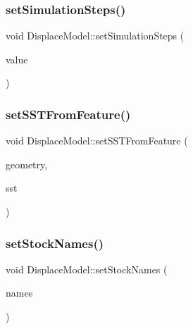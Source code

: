 \mbox{\label{class_displace_model_a37ba1a54fada6de2335be2c94f98ece3}} 
\subsubsection{\texorpdfstring{setSimulationSteps()}{setSimulationSteps()}}
{\footnotesize\ttfamily void Displace\+Model\+::set\+Simulation\+Steps (\begin{DoxyParamCaption}\item[{int}]{value }\end{DoxyParamCaption})}

\mbox{\label{class_displace_model_ab2b49b329dbd03a01b3314897f578693}} 
\subsubsection{\texorpdfstring{setSSTFromFeature()}{setSSTFromFeature()}}
{\footnotesize\ttfamily void Displace\+Model\+::set\+S\+S\+T\+From\+Feature (\begin{DoxyParamCaption}\item[{O\+G\+R\+Geometry $\ast$}]{geometry,  }\item[{double}]{sst }\end{DoxyParamCaption})}

\mbox{\label{class_displace_model_accae3c9f9c7720e2c048897bd6d874d6}} 
\subsubsection{\texorpdfstring{setStockNames()}{setStockNames()}}
{\footnotesize\ttfamily void Displace\+Model\+::set\+Stock\+Names (\begin{DoxyParamCaption}\item[{const Q\+Map$<$ Q\+String, int $>$ \&}]{names }\end{DoxyParamCaption})\hspace{0.3cm}{\ttfamily [inline]}}


